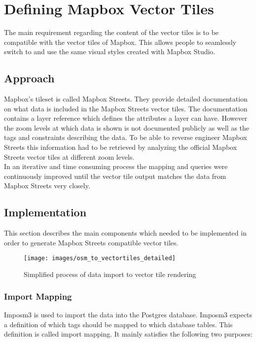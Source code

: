 \chapter{Defining Mapbox Vector Tiles}\label{chapter_defining_mapbox_vector_tiles}

The main requirement regarding the content of the vector tiles is to be compatible with the vector tiles of Mapbox. This allows people to seamlessly switch to \osmvt{} and use the same visual styles created with Mapbox Studio. 

\section{Approach}
Mapbox's tileset is called Mapbox Streets. They provide detailed documentation on what data is included in the Mapbox Streets vector tiles. The documentation contains a layer reference which defines the attributes a layer can have. However the zoom levels at which data is shown is not documented publicly as well as the \osm{} tags and constraints describing the data. To be able to reverse engineer Mapbox Streets this information had to be retrieved by analyzing the official Mapbox Streets vector tiles at different zoom levels.\\
In an iterative and time consuming process the mapping and queries were continuously improved until the vector tile output matches the data from Mapbox Streets very closely.

\section{Implementation}
This section describes the main components which needed to be implemented in order to generate Mapbox Streets compatible vector tiles.

\begin{figure}[H]
\centering
\texttt{[image: images/osm\_to\_vectortiles\_detailed]}
\caption{Simplified process of data import to vector tile rendering}
\end{figure}

\clearpage

\subsection{Import Mapping}

Imposm3 is used to import the \osm{} data into the Postgres database. Imposm3 expects a definition of which \osm{} tags should be mapped to which database tables. This definition is called import mapping. It mainly satisfies the following two purposes:

